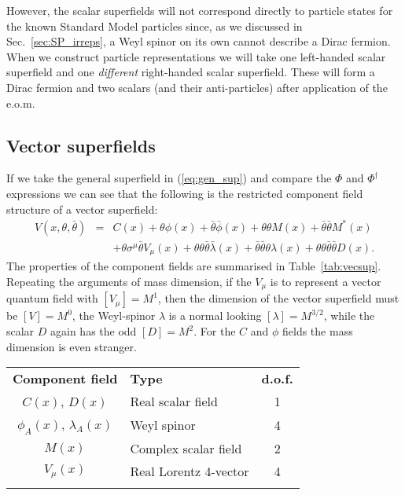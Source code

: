 \documentclass[notes.tex]{subfiles}
\begin{document}
However, the scalar superfields will not correspond directly to particle states for the known Standard Model particles since, as we discussed in Sec.~\ref{sec:SP_irreps}, a Weyl spinor on its own cannot describe a Dirac fermion. When we construct particle representations we will take one left-handed scalar superfield and one {\it different} right-handed scalar superfield. These will form a Dirac fermion and two scalars (and their anti-particles) after application of the e.o.m. 

\subsection{Vector superfields}
If we take the general superfield in (\ref{eq:gen_sup}) and compare the $\Phi$ and $\Phi^\dagger$ expressions we can see that the following is the restricted component field structure of a vector superfield:
\begin{eqnarray*}
V(x, \theta, \bar{\theta}) &=& C(x) + \theta\phi(x) + \bar{\theta}\bar{\phi}(x) + \theta\theta M(x) + \bar{\theta}\bar{\theta}M^*(x) \\
&& + \theta \sigma^\mu \bar{\theta}V_\mu(x) + \theta \theta \bar{\theta}\bar{\lambda}(x) +\bar{\theta}\bar{\theta}\theta\lambda(x) + \theta\theta\bar{\theta}\bar{\theta}D(x).
\end{eqnarray*} 
The properties of the component fields  are summarised in Table~\ref{tab:vecsup}. Repeating the arguments of mass dimension, if the $V_\mu$ is to represent a vector quantum field with $[V_\mu]=M^1$, then the dimension of the vector superfield must be $[V]=M^0$, the Weyl-spinor $\lambda$ is a normal looking $[\lambda]=M^{3/2}$, while the scalar $D$ again has the odd $[D]=M^2$. For the $C$ and $\phi$ fields the mass dimension is even stranger.


\begin{center}
   \begin{tabular}{c |l| c} 
   \noalign{\smallskip}\hline\noalign{\smallskip}
   {\bf Component field} & {\bf Type} & {\bf d.o.f.} \\
   \noalign{\smallskip}\hline\noalign{\smallskip}
   $C(x)$, $D(x)$ & Real scalar field& 1\\
  $\phi_A(x)$, $\lambda_A(x)$ &Weyl spinor & 4\\
  $M(x)$ &Complex scalar field & 2\\
  $V_\mu(x)$ & Real Lorentz 4-vector & 4\\
  \noalign{\smallskip}\hline\noalign{\smallskip}
    \end{tabular}
   \end{center}
\end{document}
